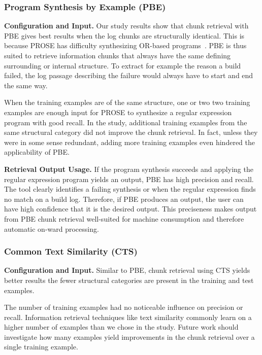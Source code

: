 \subsubsection{Program Synthesis by Example (PBE)}

\noindent
\textbf{Configuration and Input.}
Our study results show that chunk retrieval with PBE gives best
results when the log chunks are structurally identical.
This is
because PROSE has difficulty synthesizing OR-based
programs~\cite{mayer2015user}.
PBE is thus suited to retrieve information
chunks that always have the same defining surrounding or internal
structure.
To extract for example the reason a build failed, the log
passage describing the failure would always have to start and
end the same way.

When the training examples are of the same structure, one or two
two training examples are enough input for PROSE to synthesize a regular
expression program with good recall.
In the study, additional training
examples from the same structural category
did not improve the chunk retrieval.
In fact, unless they
were in some sense redundant, adding more training examples even
hindered the applicability of PBE.

\noindent
\textbf{Retrieval Output Usage.}
If the program synthesis succeeds and applying the regular expression
program yields an output, PBE has high precision and recall.
The tool
clearly identifies a failing synthesis or when the regular expression
finds no match on a build log.
Therefore, if PBE produces
an output, the user can have high confidence that it is the desired
output.
This preciseness makes output from PBE chunk retrieval
well-suited for machine consumption and therefore automatic on-ward
processing.

\subsubsection{Common Text Similarity (CTS)}
\noindent
\textbf{Configuration and Input.}
Similar to PBE, chunk retrieval using CTS yields better results the
fewer structural categories are present in the training and test
examples.

The number of training examples had no noticeable influence on
precision or recall.
Information retrieval techniques
like text similarity commonly learn on a higher number of examples
than we chose in the study.
Future work should investigate how many
examples yield improvements in the chunk retrieval over a single
training example.

